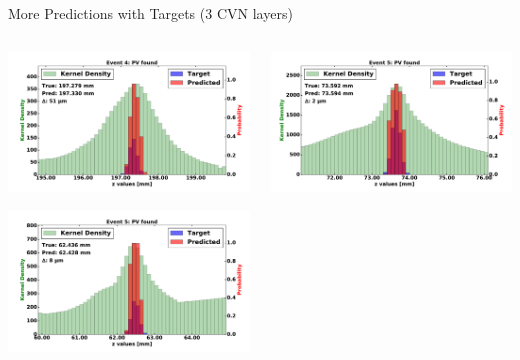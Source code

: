 \begin{frame}{More Predictions with Targets (3 CVN layers)}
  \begin{columns}[c]
        \begin{center}
            \includegraphics[width=1\textwidth,height=0.45\textwidth, trim=18 0 18 0]{images/120000_3layer_28.pdf}
    
            \includegraphics[width=1\textwidth, height=0.45\textwidth,trim=18 0 18 0]{images/120000_3layer_29.pdf}

        \end{center}
        \begin{center}
           \includegraphics[width=1\textwidth, height=0.45\textwidth, trim=18 0 18 0]{images/120000_3layer_30.pdf}
    

\end{center}
\end{columns}
\end{frame}
